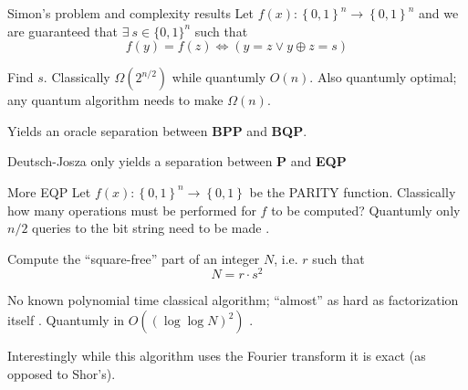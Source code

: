 \documentclass{beamer}
\begin{document}
\begin{frame}{Simon's problem and complexity results}
Let $f\left(x\right):\left\{ 0,1\right\} ^{n}\to\left\{ 0,1\right\}^n$ and we are guaranteed that $\exists ~ s\in \{0,1\}^n$ such that 
\[
  f\left(y\right)=f\left(z\right) \iff \left(y=z \vee y\oplus z = s\right)
\]

Find $s$. Classically $\Omega\left(2^{n/2}\right)$ while quantumly $O\left(n\right)$. Also quantumly optimal; any quantum algorithm
needs to make $\Omega\left(n\right)$. 

\vspace{\baselineskip}

Yields an oracle separation between \textbf{BPP} and \textbf{BQP}. 

\vspace{\baselineskip}



Deutsch-Josza only yields a separation between \textbf{P} and \textbf{EQP}

\end{frame}
\begin{frame}{More EQP}
Let $f\left(x\right):\left\{ 0,1\right\} ^{n}\to\left\{ 0,1\right\}$ be the PARITY function. Classically how many operations must be performed for $f$ to be computed?
Quantumly only $n/2$ queries to the bit string need to be made \cite{de2002quantum}.  

\vspace{\baselineskip}

Compute the ``square-free'' part of an integer $N$, i.e. $r$ such that
\[
N=r\cdot s^2
\]

No known polynomial time classical algorithm; ``almost'' as hard as factorization itself \cite{Okamoto98anew}. Quantumly in $O\left(\left(\log \log N\right)^2\right)$ \cite{li2012efficient}. 

\vspace{\baselineskip}


Interestingly while this algorithm uses the Fourier transform it is exact (as opposed to Shor's).

\end{frame}
\end{document}
